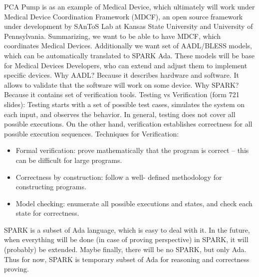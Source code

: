 PCA Pump is as an example of Medical Device, which ultimately will work under Medical Device Coordination Framework (MDCF), an open source framework under development by SAnToS Lab at Kansas State University and University of Pennsylvania.
Summarizing, we want to be able to have MDCF, which coordinates Medical Devices. Additionally we want set of AADL/BLESS models, which can be automatically translated to SPARK Ada. These models will be base for Medical Devices Developers, who can extend and adjust them to implement specific devices. 
Why AADL? Because it describes hardware and software. It allows to validate that the software will work on some device.
Why SPARK? Because it contains set of verification tools. 
Testing vs Verification (form 721 slides): Testing starts with a set of possible test cases, simulates the system on each input, and observes the behavior. In general, testing does not cover all possible executions. On the other hand, verification establishes correctness for all possible execution sequences.
Techniques for Verification:
\begin{itemize}
	\item Formal verification: prove mathematically that the program is correct – this can be difficult for large programs.
	\item Correctness by construction: follow a well- defined methodology for constructing programs.
	\item Model checking: enumerate all possible executions and states, and check each state for correctness.
\end{itemize}
SPARK is a subset of Ada language, which is easy to deal with it. In the future, when everything will be done (in case of proving perspective) in SPARK, it will (probably) be extended. Maybe finally, there will be no SPARK, but only Ada. Thus for now, SPARK is temporary subset of Ada for reasoning and correctness proving.



